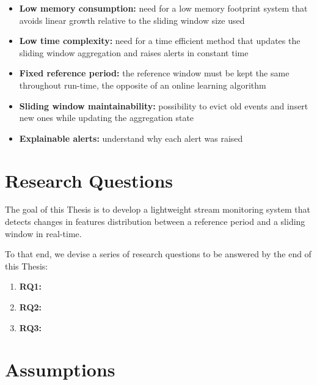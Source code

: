 \begin{itemize}
    \item \textbf{Low memory consumption:} need for a low memory footprint system that avoids linear growth relative to the sliding window size used
    
    \item \textbf{Low time complexity:} need for a time efficient method that updates the sliding window aggregation and raises alerts in constant time
    
    \item \textbf{Fixed reference period:} the reference window must be kept the same throughout run-time, the opposite of an online learning algorithm
    
    \item \textbf{Sliding window maintainability:} possibility to evict old events and insert new ones while updating the aggregation state
    
    \item \textbf{Explainable alerts:} understand why each alert was raised
\end{itemize}


\section{Research Questions}
The goal of this Thesis is to develop a lightweight stream monitoring system that detects changes in features distribution between a reference period and a sliding window in real-time.

To that end, we devise a series of research questions to be answered by the end of this Thesis:

\begin{enumerate}
    \item \textbf{RQ1:}
    \item \textbf{RQ2:}
    \item \textbf{RQ3:}
\end{enumerate}


\section{Assumptions}